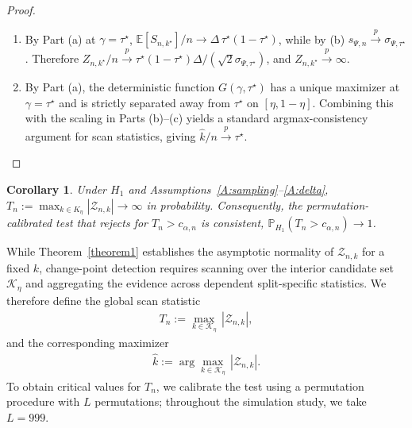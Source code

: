 \documentclass[11pt]{article}
\numberwithin{theorem}{section}
\newtheorem{Corollary}{Corollary}
\numberwithin{Lemma}{section}
\numberwithin{Definition}{section}
\newcommand{\EE}{\mathbb{E}}
\newcommand{\cp}{k^\star}
\newcommand{\tstar}{\tau^\star}
\begin{document}
\begin{proof}
\begin{enumerate}
\item[(c)] By Part (a) at $\gamma=\tstar$, $\EE[S_{n,\cp}]/n\to \Delta\,\tstar(1-\tstar)$, while by (b)
$s_{\Psi,n} \xrightarrow{p} \sigma_{\Psi,\tstar}$. Therefore $Z_{n,\cp}/n \xrightarrow{p} \tstar(1-\tstar)\Delta/(\sqrt{2}\sigma_{\Psi,\tstar})$,
and $Z_{n,\cp} \xrightarrow{p} \infty$.

\item[(d)] By Part (a), the deterministic function $G(\gamma,\tstar)$ has a unique maximizer at $\gamma=\tstar$ and is strictly
separated away from $\tstar$ on $[\eta,1-\eta]$. Combining this with the scaling in Parts (b)--(c) yields a standard
argmax-consistency argument for scan statistics, giving $\hat{k}/n \xrightarrow{p} \tstar$.
\end{enumerate}
\end{proof}

\begin{Corollary}\label{cor:scan_consistency}
Under $H_1$ and Assumptions~\ref{A:sampling}–\ref{A:delta}, $T_n:=\max_{k\in K_\eta}|\mathcal{Z}_{n,k}|\to\infty$ in probability.
Consequently, the permutation-calibrated test that rejects for $T_n>c_{\alpha,n}$
is consistent, $\mathbb{P}_{H_1}(T_n>c_{\alpha,n})\to 1$.
\end{Corollary}


While Theorem~\ref{theorem1} establishes the asymptotic normality of $\mathcal{Z}_{n,k}$ for a fixed $k$,
change-point detection requires scanning over the interior candidate set $\mathcal{K}_\eta$ and aggregating
the evidence across dependent split-specific statistics. We therefore define the global scan statistic
\begin{equation*}
\begin{aligned}
T_n := \max_{k\in\mathcal{K}_\eta}\,|\mathcal{Z}_{n,k}|,
\end{aligned}
\end{equation*}
and the corresponding maximizer
\begin{equation*}
\begin{aligned}
\hat{k}:=\arg\max_{k\in\mathcal{K}_\eta}\,|\mathcal{Z}_{n,k}|.
\end{aligned}
\end{equation*}
To obtain critical values for $T_n$, we calibrate the test using a permutation procedure with $L$ permutations; throughout the simulation study, we take $L=999$. \\
\end{document}
